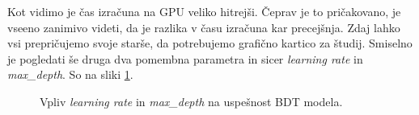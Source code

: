 \documentclass[a4paper]{article}
\begin{document}
Kot vidimo je čas izračuna na GPU veliko hitrejši. Čeprav je to pričakovano, je vseeno zanimivo videti, da je razlika v času
izračuna kar precejšnja. Zdaj lahko vsi prepričujemo svoje starše, da potrebujemo grafično kartico za študij. Smiselno je pogledati
še druga dva pomembna parametra in sicer \textit{learning rate} in \textit{max\_depth}. So na sliki \ref{fig:BDT_params}. \\

\begin{figure}[H]
    \centering
    \caption{Vpliv \textit{learning rate} in \textit{max\_depth} na uspešnost BDT modela.}
    \label{fig:BDT_params}
\end{figure}
\end{document}
